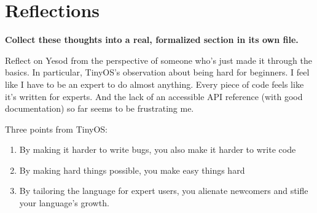 \documentclass{article}
\newcommand {\todo}[1] {{\textbf{\color{red}#1}}}
\begin{document}
\section{Reflections}

\todo{Collect these thoughts into a real, formalized section in its own file.}

Reflect on Yesod from the perspective of someone who's just made it through the basics. In particular, TinyOS's observation about being hard for beginners. I feel like I have to be an expert to do almost anything. Every piece of code feels like it's written for experts. And the lack of an accessible API reference (with good documentation) so far seems to be frustrating me.

Three points from TinyOS:
\begin{enumerate}
  \item By making it harder to write bugs, you also make it harder to write code
  \item By making hard things possible, you make easy things hard
  \item By tailoring the language for expert users, you alienate newcomers and stifle your language's growth.
\end{enumerate}

% 
% 
% 
% 

\printbibliography
\end{document}
